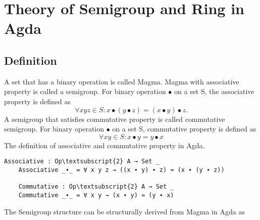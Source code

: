 \chapter{Theory of Semigroup and Ring in Agda}
\section{Definition}
A set that has a binary operation is called Magma. Magma with associative property is called a semigroup. For binary operation \(∙\) on a set S, the associative property is defined as 
\begin{equation}
\forall x y z \in S : x ∙ (y ∙ z) = (x ∙ y) ∙ z.
\end{equation}
 A semigroup that satisfies commutative property is called commutative semigroup. For binary operation \( ∙ \) on a set S, commutative property is defined as 
\begin{equation}
\forall x y \in S : x ∙ y = y ∙ x
\end{equation}
The definition of associative and commutative property in Agda.
\begin{Verbatim}[commandchars=\\\{\},samepage=true]
	Associative : Op\textsubscript{2} A → Set _
	Associative _∙_ = ∀ x y z → ((x ∙ y) ∙ z) ≈ (x ∙ (y ∙ z))

	Commutative : Op\textsubscript{2} A → Set _
	Commutative _∙_ = ∀ x y → (x ∙ y) ≈ (y ∙ x)
\end{Verbatim}

The Semigroup structure can be structurally derived from Magma in Agda as 

